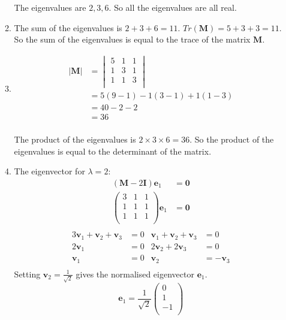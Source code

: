 \documentclass[10pt,oneside,a4paper]{article}
\begin{document}
\begin{enumerate}
\begin{enumerate}[label=(\roman*)]
The eigenvalues are $2, 3, 6$. So all the eigenvalues are all real.

\item

The sum of the eigenvalues is $2 + 3 + 6 = 11$. $Tr(\mathbf{M}) = 5 + 3 + 3 = 11$. So the sum of the eigenvalues is
equal to the trace of the matrix $\mathbf{M}$.

\item

\[
\begin{split}
|\mathbf{M}| &=
\begin{vmatrix}
5 & 1 & 1 \\
1 & 3 & 1 \\
1 & 1 & 3 \\
\end{vmatrix} \\
&=
5 (9 - 1) - 1(3 - 1) + 1(1 - 3) \\
&= 40 - 2 - 2 \\
&= 36 \\
\end{split}
\]

The product of the eigenvalues is $2 \times 3 \times 6 = 36$. So the product of the eigenvalues is equal to the
determinant of the matrix.

\item
The eigenvector for $\lambda = 2$:
\[
\begin{split}
(\mathbf{M} - 2\mathbf{I})\mathbf{e}_1 &= \mathbf{0} \\
\begin{pmatrix}
3 & 1 & 1 \\
1 & 1 & 1 \\
1 & 1 & 1 \\
\end{pmatrix}
\mathbf{e}_1 &= \mathbf{0} \\
\end{split}
\]
\begin{align*}
3\mathbf{v}_1 + \mathbf{v}_2 + \mathbf{v}_3 &= 0 & \mathbf{v}_1 + \mathbf{v}_2 + \mathbf{v}_3 &= 0 \\
2\mathbf{v}_1 &= 0 & 2\mathbf{v}_2 + 2\mathbf{v}_3 &= 0 \\
\mathbf{v}_1 &= 0 & \mathbf{v}_2 &= -\mathbf{v}_3 \\
\end{align*}
Setting $\mathbf{v}_2 = \frac{1}{\sqrt {2}}$ gives the normalised eigenvector $\mathbf{e}_1$.
\[
\mathbf{e}_1 =
\frac{1}{\sqrt {2}}\begin{pmatrix}
0 \\ 1 \\ -1 \\
\end{pmatrix}
\]


\end{enumerate}
\end{enumerate}
\end{document}
